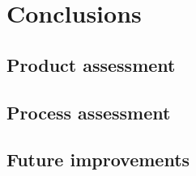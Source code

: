 \chapter{Conclusions}

\section{Product assessment}
%

\section{Process assessment}

\section{Future improvements}
